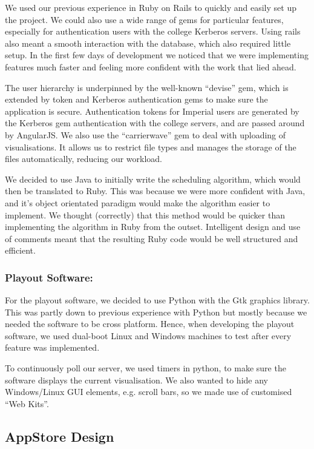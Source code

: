 \documentclass[a4paper, titlepage]{article}
\begin{document}
We used our previous experience in Ruby on Rails to quickly and easily set up the project. We could also
use a wide range of gems for particular features, especially for authentication users with the college
Kerberos servers. Using rails also meant a smooth interaction with the database, which also required 
little setup. In the first few days of development we noticed that we were implementing features much
faster and feeling more confident with the work that lied ahead. 

The user hierarchy is underpinned by the well-known ``devise'' gem, which is extended by token and 
Kerberos authentication gems to make sure the application is secure. Authentication tokens for Imperial 
users are generated by the Kerberos gem authentication with the college servers, and are passed around 
by AngularJS. We also use the ``carrierwave'' gem to deal with uploading of visualisations. It allows us
to restrict file types and manages the storage of the files automatically, reducing our workload. 

We decided to use Java to initially write the scheduling algorithm, which would then be translated to 
Ruby. This was because we were more confident with Java, and it's object orientated paradigm would make 
the algorithm easier to implement. We thought (correctly) that this method would be quicker than
implementing the algorithm in Ruby from the outset. Intelligent design and use of comments meant that
the resulting Ruby code would be well structured and efficient.
  

\subsubsection{Playout Software: }
For the playout software, we decided to use Python with the Gtk graphics library. This was partly down
to previous experience with Python but mostly because we needed the software to be cross platform. Hence,
when developing the playout software, we used dual-boot Linux and Windows machines to test after every 
feature was implemented. 

To continuously poll our server, we used timers in python, to make sure the software displays the 
current visualisation. We also wanted to hide any Windows/Linux GUI elements, e.g. scroll bars, so we 
made use of customised ``Web Kits''.


\subsection{AppStore Design}
\end{document}
